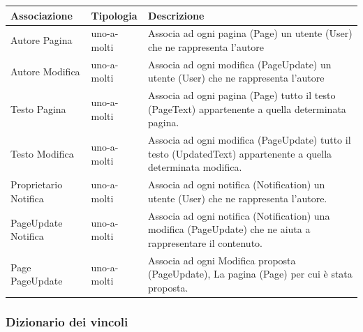 \documentclass{article}
\begin{document}
{	\begin{table}[H]
		\centering
		\small %
		\setlength{\tabcolsep}{6pt} %
		\renewcommand{\arraystretch}{1.2} %
		
		
		\begin{tabularx}{\textwidth}{|l|l|X|}
			\hline
			\textbf{Associazione} &\textbf{Tipologia}  & \textbf{Descrizione} \\
			\hline
			Autore Pagina & uno-a-molti  & Associa ad ogni pagina (Page) un utente (User) che ne rappresenta l'autore
			\\
			\hline
			Autore Modifica & uno-a-molti  & Associa ad ogni modifica (PageUpdate) un utente (User) che ne rappresenta l'autore
			\\
			\hline
			Testo Pagina & uno-a-molti  & Associa ad ogni pagina (Page) tutto il testo (PageText) appartenente a quella determinata pagina.
			\\
			\hline
			Testo Modifica & uno-a-molti  & Associa ad ogni modifica (PageUpdate) tutto il testo (UpdatedText) appartenente a quella determinata modifica.
			\\
			\hline
			Proprietario Notifica & uno-a-molti  & Associa ad ogni notifica (Notification) un utente (User) che ne rappresenta l'autore.
			\\
			\hline
			PageUpdate Notifica & uno-a-molti  & Associa ad ogni notifica (Notification) una modifica (PageUpdate) che ne aiuta a rappresentare il contenuto.
			\\
			\hline
			Page PageUpdate & uno-a-molti  & Associa ad ogni Modifica proposta (PageUpdate), La pagina (Page) per cui \`e stata proposta. 
			\\
			\hline
		\end{tabularx}
		
	
		
	\end{table}

	{\subsubsection {Dizionario dei vincoli}}
	\begin{table}[H]
		\centering
		\small %
		\setlength{\tabcolsep}{6pt} %
		\renewcommand{\arraystretch}{1.2} %
		

\end{table}}
\end{document}
